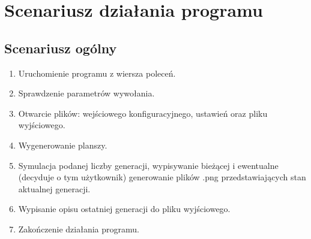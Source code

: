 \documentclass[a4paper,11pt, notitlepage ]{article}
\begin{document}
\section{Scenariusz działania programu}
\subsection{Scenariusz ogólny}
\begin{enumerate}
\item Uruchomienie programu z wiersza poleceń.
\item Sprawdzenie parametrów wywołania.
\item Otwarcie plików: wejściowego konfiguracyjnego, ustawień oraz pliku wyjściowego.
\item Wygenerowanie planszy.
\item Symulacja podanej liczby generacji, wypisywanie bieżącej i ewentualne (decyduje o tym użytkownik) generowanie plików .png przedstawiających stan aktualnej generacji.
\item Wypisanie opisu ostatniej generacji do pliku wyjściowego.
\item Zakończenie działania programu.
\end{enumerate}
\end{document}
